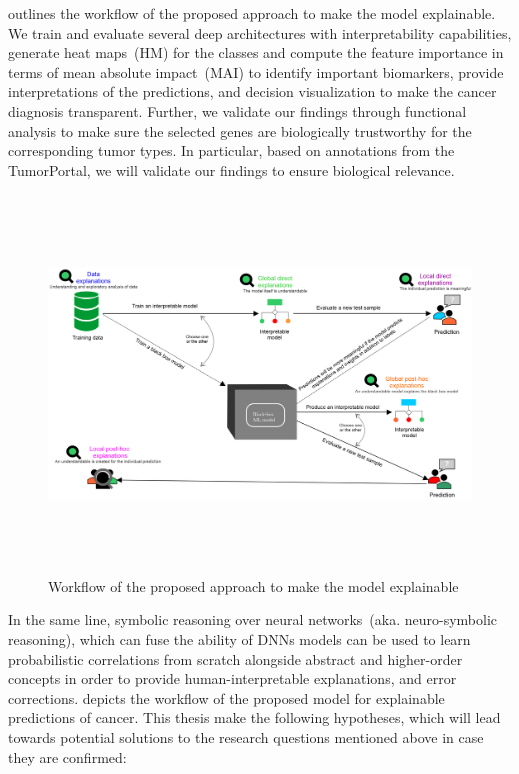 \hspace*{3.5mm}  outlines the workflow of the proposed approach to make the model explainable. We train and evaluate several deep architectures with interpretability capabilities, generate heat maps~(HM) for the classes and compute the feature importance in terms of mean absolute impact~(MAI) to identify important biomarkers, provide interpretations of the predictions, and decision visualization to make the cancer diagnosis transparent. Further, we validate our findings through functional analysis to make sure the selected genes are biologically trustworthy for the corresponding tumor types. In particular, based on annotations from the TumorPortal, we will validate our findings to ensure biological relevance. 

\begin{figure}[h]
	\centering
		\includegraphics[width=\linewidth,height=100mm]{images/g_t_l_xai.png}
		\caption{Workflow of the proposed approach to make the model explainable}
        \label{fig:chapter_2_wf}
\end{figure}

\hspace*{3.5mm} In the same line, symbolic reasoning over neural networks~(aka. neuro-symbolic reasoning), which can fuse the ability of DNNs models can be used to learn probabilistic correlations from scratch alongside abstract and higher-order concepts in order to provide human-interpretable explanations, and error corrections.  depicts the workflow of the proposed model for explainable predictions of cancer. This thesis make the following hypotheses, which will lead towards potential solutions to the research questions mentioned above in case they are confirmed:

